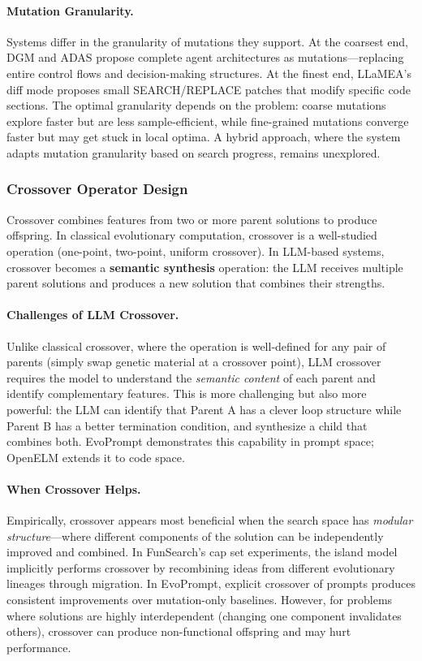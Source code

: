 \paragraph{Mutation Granularity.}
Systems differ in the granularity of mutations they support. At the coarsest end, DGM and ADAS propose complete agent architectures as mutations---replacing entire control flows and decision-making structures. At the finest end, LLaMEA's diff mode proposes small SEARCH/REPLACE patches that modify specific code sections. The optimal granularity depends on the problem: coarse mutations explore faster but are less sample-efficient, while fine-grained mutations converge faster but may get stuck in local optima. A hybrid approach, where the system adapts mutation granularity based on search progress, remains unexplored.

\subsubsection{Crossover Operator Design}

Crossover combines features from two or more parent solutions to produce offspring. In classical evolutionary computation, crossover is a well-studied operation (one-point, two-point, uniform crossover). In LLM-based systems, crossover becomes a \textbf{semantic synthesis} operation: the LLM receives multiple parent solutions and produces a new solution that combines their strengths.

\paragraph{Challenges of LLM Crossover.}
Unlike classical crossover, where the operation is well-defined for any pair of parents (simply swap genetic material at a crossover point), LLM crossover requires the model to understand the \emph{semantic content} of each parent and identify complementary features. This is more challenging but also more powerful: the LLM can identify that Parent A has a clever loop structure while Parent B has a better termination condition, and synthesize a child that combines both. EvoPrompt demonstrates this capability in prompt space; OpenELM extends it to code space.

\paragraph{When Crossover Helps.}
Empirically, crossover appears most beneficial when the search space has \emph{modular structure}---where different components of the solution can be independently improved and combined. In FunSearch's cap set experiments, the island model implicitly performs crossover by recombining ideas from different evolutionary lineages through migration. In EvoPrompt, explicit crossover of prompts produces consistent improvements over mutation-only baselines. However, for problems where solutions are highly interdependent (changing one component invalidates others), crossover can produce non-functional offspring and may hurt performance.

